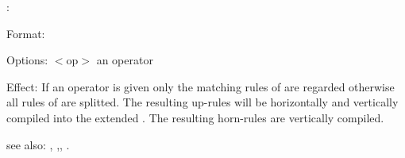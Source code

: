:

Format: 

Options: $<$op$>$ an operator

Effect: If an operator is given only the matching rules of  are 
	regarded otherwise all rules of  are splitted. The
	resulting up-rules will be horizontally and vertically compiled into the
	extended \WAM{}. The resulting horn-rules are vertically compiled.

see also: , ,, .
